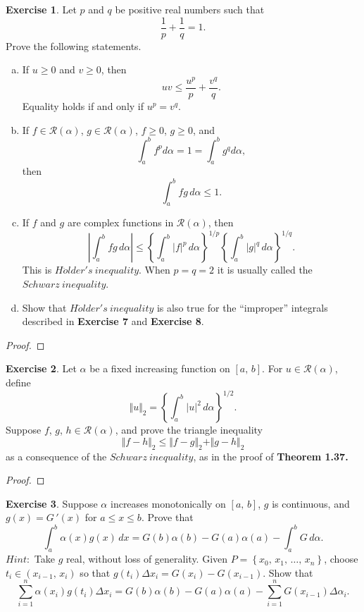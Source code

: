 \documentclass[12pt]{book}
\theoremstyle{definition}
\newtheorem{exe}{Exercise}
\begin{document}
	\newpage
	\begin{exe}
		Let $p$ and $q$ be positive real numbers such that $$\dfrac{1}{p}+\dfrac{1}{q}=1.$$ Prove the following statements.
		\begin{enumerate}[(a)]
			\item If $u\geq0$ and $v\geq0$, then $$uv\leq \dfrac{u^p}{p}+\dfrac{v^q}{q}.$$ Equality holds if and only if $u^p=v^q$.
			\item If $f\in\mathscr{R}(\alpha)$, $g\in\mathscr{R}(\alpha)$, $f\geq 0$, $g\geq 0$, and $$\int_a^b f^p d\alpha =1=\int_a ^b g^q d\alpha,$$ then $$\int_a^b fg\,d\alpha\leq 1.$$
			\item If $f$ and $g$ are complex functions in $\mathscr{R}(\alpha)$, then $$\left\vert \int_a^b fg\,d\alpha\right\vert\leq\left\{\int_a^b |f|^p\,d\alpha\right\}^{1/p}\left\{\int_a^b |g|^q\,d\alpha\right\}^{1/q}.$$ This is $H\ddot{o}lder's~inequality$. When $p=q=2$ it is usually called the $Schwarz~inequality$.
			\item Show that $H\ddot{o}lder's~inequality$ is also true for the ``improper'' integrals described in \textbf{Exercise 7} and \textbf{Exercise 8}.
		\end{enumerate}
	\end{exe}
	\newpage
	\begin{proof}
	\end{proof}
	\newpage
	\begin{exe}
		Let $\alpha$ be a fixed increasing function on $[a,\,b]$. For $u\in\mathscr{R}(\alpha)$, define $$\Vert u\Vert_2=\left\{\int_a^b |u|^2\,d\alpha\right\}^{1/2}.$$ Suppose $f$, $g$, $h\in\mathscr{R}(\alpha)$, and prove the triangle inequality $$\Vert f-h\Vert_2\leq\Vert f-g\Vert_2+\Vert g-h\Vert_2$$ as a consequence of the $Schwarz~inequality$, as in the proof of \textbf{Theorem 1.37.}
	\end{exe}
	\begin{proof}
	\end{proof}
	\newpage
	\setcounter{exe}{16}
	\begin{exe}
		Suppose $\alpha$ increases monotonically on $[a,\,b]$, $g$ is continuous, and $g(x)=G\,'(x)$ for $a\leq x \leq b$. Prove that $$\int_a^b \alpha(x)g(x)\,dx=G(b)\alpha(b)-G(a)\alpha(a)-\int_a^b G\,d\alpha.$$
		$Hint:$ Take $g$ real, without loss of generality. Given $P=\left\{x_0,\,x_1,\,\ldots,\,x_n\right\}$, choose $t_i\in(x_{i-1},\,x_i)$ so that $g(t_i)\Delta x_i=G(x_i)-G(x_{i-1}).$ Show that $$\sum_{i=1}^n\alpha(x_i)g(t_i)\Delta x_i=G(b)\alpha(b)-G(a)\alpha(a)-\sum_{i=1}^n G(x_{i-1})\Delta\alpha_i.$$
	\end{exe}
\end{document}

